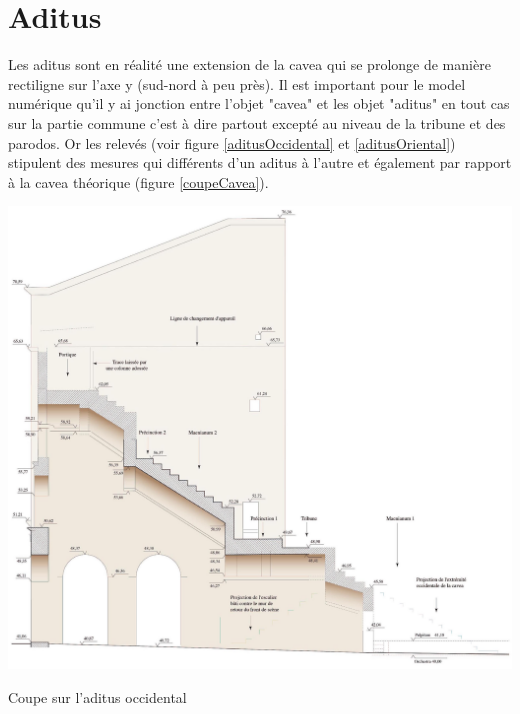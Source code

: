 		
		\section{Aditus} 
		
Les aditus sont en réalité une extension de la cavea qui se prolonge de manière rectiligne sur l'axe y (sud-nord à peu près). Il est important pour le model numérique qu'il y ai jonction entre l'objet "cavea" et les objet "aditus" en tout cas sur la partie commune c'est à dire partout excepté au niveau de la tribune et des \gls{parodos}. Or les relevés (voir figure \ref{aditusOccidental} et \ref{aditusOriental}) stipulent des mesures qui différents d'un aditus à l'autre et également par rapport à la cavea théorique (figure \ref{coupeCavea}).

		
\begin{figureth}
	\begin{subfigureth}{0.49\textwidth}
		\includegraphics[width=\linewidth]{images/aditusOccidental}
		\caption[Coupe sur l'\gls{aditus} occidental]{Coupe sur l'\gls{aditus} occidental \cite[Pl. XLVIII]{orangePl}}
		\label{aditusOccidental}
	\end{subfigureth}	
	\begin{subfigureth}{0.49\textwidth}

\end{subfigureth}
\end{figureth}
